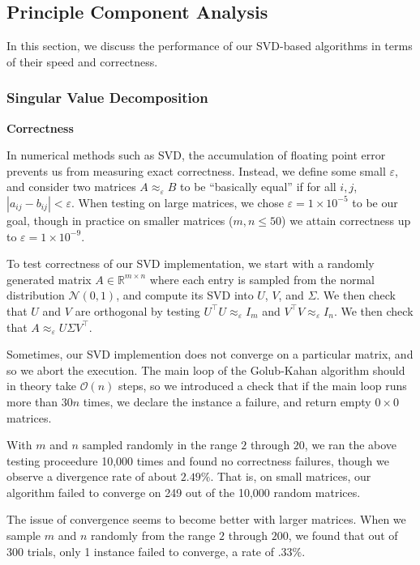 \documentclass[12pt, letterpaper]{article}
\theoremstyle{definition}
\theoremstyle{remark}
\newcommand{\R}{\mathbb{R}}
\begin{document}
\subsection{Principle Component Analysis}

In this section, we discuss the performance of our SVD-based algorithms in terms 
of their speed and correctness.

\subsubsection{Singular Value Decomposition}

\begin{center}
    \textbf{Correctness}
\end{center}

In numerical methods such as SVD, the accumulation of floating point error prevents us from measuring exact correctness.
Instead, we define some small $\varepsilon$, and consider two matrices $A \approx_\varepsilon B$ to be ``basically equal'' if 
for all $i, j$, $|a_{ij} - b_{ij}| < \varepsilon$. When testing on large matrices, we chose $\varepsilon = 1 \times 10^{-5}$
to be our goal, though in practice on smaller matrices ($m, n \leq 50$) we attain correctness up to $\varepsilon = 1 \times 10^{-9}$.

To test correctness of our SVD implementation, we start with a randomly generated matrix $A \in \R^{m \times n}$
where each entry is sampled from the normal distribution $\mathcal N(0, 1)$, and compute its SVD into $U$, $V$, 
and $\Sigma$. We then check that $U$ and $V$ are orthogonal by testing $U^\top U \approx_\varepsilon I_m$ 
and $V^\top V \approx_\varepsilon I_n$. We then check that $A \approx_\varepsilon U \Sigma V^\top$. 

Sometimes, our SVD implemention does not converge on a particular matrix, and so we abort the execution. The main loop 
of the Golub-Kahan algorithm should in theory take $\mathcal O(n)$ steps, so we introduced a check that if the main loop
runs more than $30n$ times, we declare the instance a failure, and return empty $0 \times 0$ matrices.

With $m$ and $n$ sampled randomly in the range $2$ through $20$, we ran the above testing proceedure 10,000 times and 
found no correctness failures, though we observe a divergence rate of about $2.49\%$. That is, on small matrices, our 
algorithm failed to converge on 249 out of the 10,000 random matrices.

The issue of convergence seems to become better with larger matrices. When we sample $m$ and $n$ randomly from the range 
$2$ through $200$, we found that out of 300 trials, only 1 instance failed to converge, a rate of $.33\%$.
\end{document}
